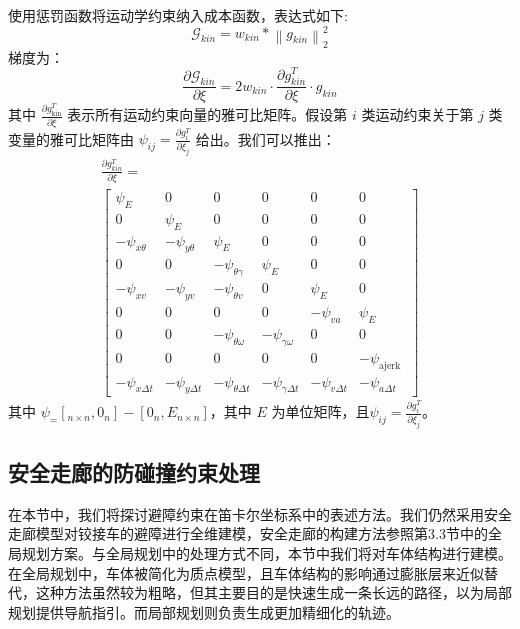 \documentclass[master,academic]{ysuthesis} %
\begin{document}
		使用惩罚函数将运动学约束纳入成本函数，表达式如下:
		\begin{equation}
			\mathcal{G}_{kin} = w_{kin}*\left \| g_{kin} \right \|_2^2
		\end{equation}
		梯度为：
		\begin{equation}
			\frac{\partial\mathcal{G}_{kin}}{\partial\xi}=2w_{kin}\cdot\frac{\partial g_{kin}^T}{\partial\xi}\cdot g_{kin}\label{18}
		\end{equation}
		其中 \(\frac{\partial g_{\text{kin}}^T}{\partial \xi}\) 表示所有运动约束向量的雅可比矩阵。假设第 \(i\) 类运动约束关于第 \(j\) 类变量的雅可比矩阵由 \(\psi_{ij} = \frac{\partial g^T_{i}}{\partial \xi_j}\) 给出。我们可以推出：
		\begin{equation}
			\begin{array}{c}
				\frac{\partial g_{k i n}^{T}}{\partial \xi}= \\
				{\left[\begin{array}{cccccc}
						\psi_{E} & 0 & 0 & 0 & 0 & 0 \\
						0 & \psi_{E} & 0 & 0 & 0 & 0 \\
						-\psi_{x \theta} & -\psi_{y \theta} & \psi_{E} & 0 & 0 & 0 \\
						0 & 0 & -\psi_{\theta \gamma} & \psi_{E} & 0 & 0 \\
						-\psi_{x v} & -\psi_{y v} & -\psi_{\theta v} & 0 & \psi_{E} & 0 \\
						0 & 0 & 0 & 0 & -\psi_{v a} & \psi_{E} \\
						0 & 0 & -\psi_{\theta \omega} & -\psi_{\gamma \omega} & 0 & 0 \\
						0 & 0 & 0 & 0 & 0 & -\psi_{\text {ajerk }} \\
						-\psi_{x \Delta t} & -\psi_{y \Delta t} & -\psi_{\theta \Delta t} & -\psi_{\gamma \Delta t} & -\psi_{v \Delta t} & -\psi_{a \Delta t}
					\end{array}\right]}
			\end{array}
		\end{equation}
		其中 $\psi _ = [_{n \times n}, 0_n] - [0_n, E_{n \times n}]$，其中 $E$ 为单位矩阵，且\(\psi_{ij} = \frac{\partial g^T_{i}}{\partial \xi_j}\)。
		\subsection{安全走廊的防碰撞约束处理}
		在本节中，我们将探讨避障约束在笛卡尔坐标系中的表述方法。我们仍然采用安全走廊模型对铰接车的避障进行全维建模，安全走廊的构建方法参照第3.3节中的全局规划方案。与全局规划中的处理方式不同，本节中我们将对车体结构进行建模。在全局规划中，车体被简化为质点模型，且车体结构的影响通过膨胀层来近似替代，这种方法虽然较为粗略，但其主要目的是快速生成一条长远的路径，以为局部规划提供导航指引。而局部规划则负责生成更加精细化的轨迹。
\end{document}
